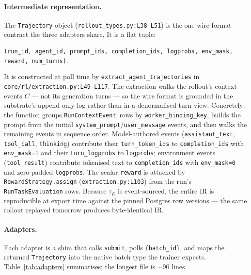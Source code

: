 \documentclass{article}
\begin{document}
\paragraph{Intermediate representation.} The
\texttt{Trajectory} object (\texttt{rollout\_types.py:L38-L51})
is the one wire-format contract the three adapters share. It
is a flat tuple:
\begin{center}
\texttt{(run\_id, agent\_id, prompt\_ids, completion\_ids,
logprobs, env\_mask, reward, num\_turns)}.
\end{center}
It is constructed at poll time by
\texttt{extract\_agent\_trajectories} in
\texttt{core/rl/extraction.py:L49-L117}. The extraction walks
the rollout's context events $C$ --- not its generation turns
--- so the wire format is grounded in the substrate's
append-only log rather than in a denormalised turn view.
Concretely: the function groups \texttt{RunContextEvent}~rows
by \texttt{worker\_binding\_key}, builds the prompt from the
initial \texttt{system\_prompt}/\texttt{user\_message} events,
and then walks the remaining events in sequence order.
Model-authored events (\texttt{assistant\_text},
\texttt{tool\_call}, \texttt{thinking}) contribute their
\texttt{turn\_token\_ids} to \texttt{completion\_ids} with
\texttt{env\_mask=1} and their \texttt{turn\_logprobs} to
\texttt{logprobs}; environment events (\texttt{tool\_result})
contribute tokenised text to \texttt{completion\_ids} with
\texttt{env\_mask=0} and zero-padded \texttt{logprobs}. The
scalar \texttt{reward} is attached by
\texttt{RewardStrategy.assign} (\texttt{extraction.py:L103})
from the run's \texttt{RunTaskEvaluation} rows. Because
$\tau_E$ is event-sourced, the entire IR is reproducible at
export time against the pinned Postgres row versions --- the
same rollout replayed tomorrow produces byte-identical IR.

\paragraph{Adapters.} Each adapter is a shim that calls
\texttt{submit}, polls \texttt{\{batch\_id\}}, and maps the
returned \texttt{Trajectory} into the native batch type the
trainer expects. Table~\ref{tab:adapters} summarises; the
longest file is $\sim$90 lines.
\end{document}
